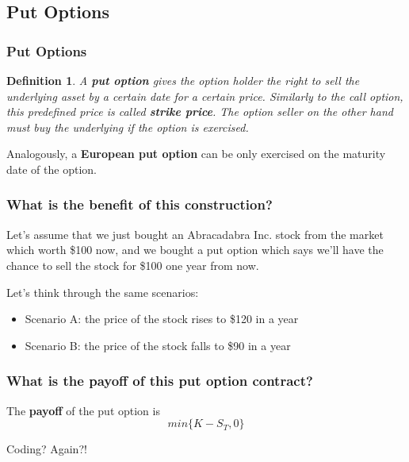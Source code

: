 \documentclass[ignorenonframetext, 9pt]{beamer}
\newtheorem{de}{Definition}
\begin{document}
\subsection{Put Options}

\begin{frame}
\frametitle{Put Options}

\begin{de}
A \textbf{put option} gives the option holder the right to \textit{sell} the underlying asset by a certain date for a certain price. Similarly to the call option, this predefined price is called \textbf{strike price}. The option seller on the other hand must \textit{buy} the underlying if the option is exercised.
\end{de}

Analogously, a \textbf{European put option} can be only exercised on the maturity date of the option.
\end{frame}

\begin{frame}
\frametitle{What is the benefit of this construction?}

Let's assume that we just bought an Abracadabra Inc. stock from the market which worth \$100 now, and we bought a put option which says we'll have the chance to sell the stock for \$100 one year from now. \newline 

Let's think through the same scenarios:

\begin{itemize}
\item Scenario A: the price of the stock rises to \$120 in a year

\item Scenario B: the price of the stock falls to \$90 in a year
\end{itemize}

\end{frame}

\begin{frame}
\frametitle{What is the payoff of this put option contract?}

The \textbf{payoff} of the put option is 
\begin{equation}
min\lbrace K - S_T, 0\rbrace
\end{equation}

\pause

\vfill
\begin{tcolorbox}[text width=\textwidth/4, boxrule=3pt, colback=mygreen!5!white, colframe=mygreen!75!black]
\textcolor{mygreen!50!black}{Coding? Again?!}
\end{tcolorbox}

\end{frame}
\end{document}
